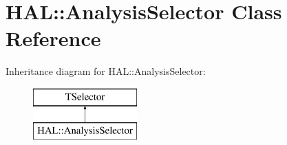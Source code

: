 \hypertarget{class_h_a_l_1_1_analysis_selector}{\section{H\+A\+L\+:\+:Analysis\+Selector Class Reference}
\label{class_h_a_l_1_1_analysis_selector}
}
Inheritance diagram for H\+A\+L\+:\+:Analysis\+Selector\+:\begin{figure}[H]
\begin{center}
\leavevmode
\includegraphics[height=2.000000cm]{class_h_a_l_1_1_analysis_selector}
\end{center}
\end{figure}
